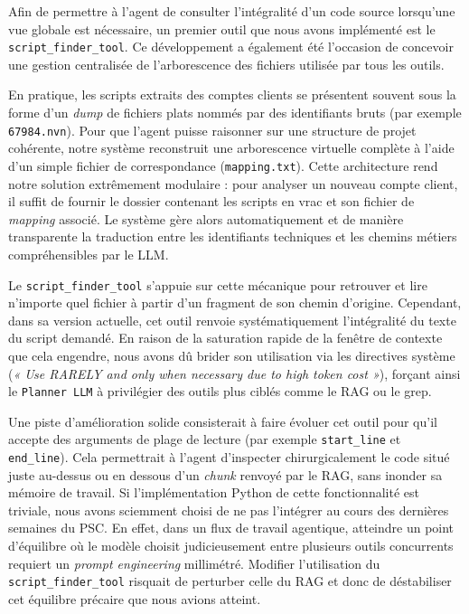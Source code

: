 Afin de permettre à l'agent de consulter l'intégralité d'un code source lorsqu'une vue globale est nécessaire, un premier outil que nous avons implémenté est le \texttt{script\_finder\_tool}. Ce développement a également été l'occasion de concevoir une gestion centralisée de l'arborescence des fichiers utilisée par tous les outils. 

En pratique, les scripts extraits des comptes clients se présentent souvent sous la forme d'un \textit{dump} de fichiers plats nommés par des identifiants bruts (par exemple \texttt{67984.nvn}). Pour que l'agent puisse raisonner sur une structure de projet cohérente, notre système reconstruit une arborescence virtuelle complète à l'aide d'un simple fichier de correspondance (\texttt{mapping.txt}). Cette architecture rend notre solution extrêmement modulaire : pour analyser un nouveau compte client, il suffit de fournir le dossier contenant les scripts en vrac et son fichier de \textit{mapping} associé. Le système gère alors automatiquement et de manière transparente la traduction entre les identifiants techniques et les chemins métiers compréhensibles par le LLM.

Le \texttt{script\_finder\_tool} s'appuie sur cette mécanique pour retrouver et lire n'importe quel fichier à partir d'un fragment de son chemin d'origine. Cependant, dans sa version actuelle, cet outil renvoie systématiquement l'intégralité du texte du script demandé. En raison de la saturation rapide de la fenêtre de contexte que cela engendre, nous avons dû brider son utilisation via les directives système (\textit{« Use RARELY and only when necessary due to high token cost »}), forçant ainsi le \texttt{Planner LLM} à privilégier des outils plus ciblés comme le RAG ou le grep.

Une piste d'amélioration solide consisterait à faire évoluer cet outil pour qu'il accepte des arguments de plage de lecture (par exemple \texttt{start\_line} et \texttt{end\_line}). Cela permettrait à l'agent d'inspecter chirurgicalement le code situé juste au-dessus ou en dessous d'un \textit{chunk} renvoyé par le RAG, sans inonder sa mémoire de travail. Si l'implémentation Python de cette fonctionnalité est triviale, nous avons sciemment choisi de ne pas l'intégrer au cours des dernières semaines du PSC. En effet, dans un flux de travail agentique, atteindre un point d'équilibre où le modèle choisit judicieusement entre plusieurs outils concurrents requiert un \textit{prompt engineering} millimétré. Modifier l'utilisation du \texttt{script\_finder\_tool} risquait de perturber celle du RAG et donc de déstabiliser cet équilibre précaire que nous avions atteint. 

